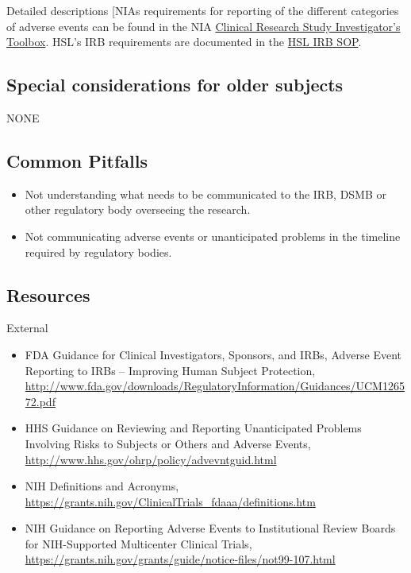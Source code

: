 \documentclass[]{book}
\theoremstyle{definition}
\theoremstyle{definition}
\theoremstyle{definition}
\theoremstyle{remark}
\begin{document}
Detailed descriptions {[}NIAs requirements for reporting of the
different categories of adverse events can be found in the NIA
\href{https://www.nia.nih.gov/research/dgcg/clinical-research-study-investigators-toolbox/adverse-events}{Clinical
Research Study Investigator's Toolbox}. HSL's IRB requirements are
documented in the
\href{http://thehslhub/~/media/HSLNet/Docs/IFAR/IRB/IRB_SOP.ashx}{HSL
IRB SOP}.

\subsection{Special considerations for older
subjects}\label{special-considerations-for-older-subjects-6}

NONE

\subsection{Common Pitfalls}\label{common-pitfalls-9}

\begin{itemize}
\item
  Not understanding what needs to be communicated to the IRB, DSMB or
  other regulatory body overseeing the research.
\item
  Not communicating adverse events or unanticipated problems in the
  timeline required by regulatory bodies.
\end{itemize}

\subsection{Resources}\label{resources-10}

External

\begin{itemize}
\item
  FDA Guidance for Clinical Investigators, Sponsors, and IRBs, Adverse
  Event Reporting to IRBs -- Improving Human Subject Protection,
  \url{http://www.fda.gov/downloads/RegulatoryInformation/Guidances/UCM126572.pdf}
\item
  HHS Guidance on Reviewing and Reporting Unanticipated Problems
  Involving Risks to Subjects or Others and Adverse Events,
  \url{http://www.hhs.gov/ohrp/policy/advevntguid.html}
\item
  NIH Definitions and Acronyms,
  \url{https://grants.nih.gov/ClinicalTrials_fdaaa/definitions.htm}
\item
  NIH Guidance on Reporting Adverse Events to Institutional Review
  Boards for NIH-Supported Multicenter Clinical Trials,
  \url{https://grants.nih.gov/grants/guide/notice-files/not99-107.html}
\end{itemize}
\end{document}
